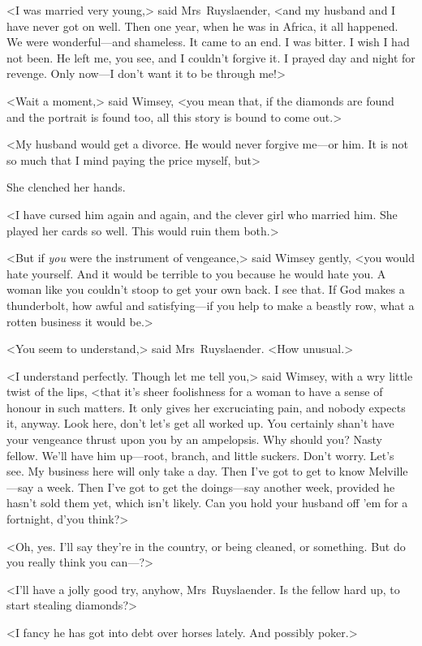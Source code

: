 <I was married very young,> said Mrs~Ruyslaender, <and my husband and I have never got on well. Then one year, when he was in Africa, it all happened. We were wonderful—and shameless. It came to an end. I was bitter. I wish I had not been. He left me, you see, and I couldn't forgive it. I prayed day and night for revenge. Only now—I don't want it to be through me!>

<Wait a moment,> said Wimsey, <you mean that, if the diamonds are found and the portrait is found too, all this story is bound to come out.>

<My husband would get a divorce. He would never forgive me—or him. It is not so much that I mind paying the price myself, but\longdash>

She clenched her hands.

<I have cursed him again and again, and the clever girl who married him. She played her cards so well. This would ruin them both.>

<But if \textit{you} were the instrument of vengeance,> said Wimsey gently, <you would hate yourself. And it would be terrible to you because he would hate you. A woman like you couldn't stoop to get your own back. I see that. If God makes a thunderbolt, how awful and satisfying—if you help to make a beastly row, what a rotten business it would be.>

<You seem to understand,> said Mrs~Ruyslaender. <How unusual.>

<I understand perfectly. Though let me tell you,> said Wimsey, with a wry little twist of the lips, <that it's sheer foolishness for a woman to have a sense of honour in such matters. It only gives her excruciating pain, and nobody expects it, anyway. Look here, don't let's get all worked up. You certainly shan't have your vengeance thrust upon you by an ampelopsis. Why should you? Nasty fellow. We'll have him up—root, branch, and little suckers. Don't worry. Let's see. My business here will only take a day. Then I've got to get to know Melville—say a week. Then I've got to get the doings—say another week, provided he hasn't sold them yet, which isn't likely. Can you hold your husband off 'em for a fortnight, d'you think?>

<Oh, yes. I'll say they're in the country, or being cleaned, or something. But do you really think you can—?>

<I'll have a jolly good try, anyhow, Mrs~Ruyslaender. Is the fellow hard up, to start stealing diamonds?>

<I fancy he has got into debt over horses lately. And possibly poker.>

